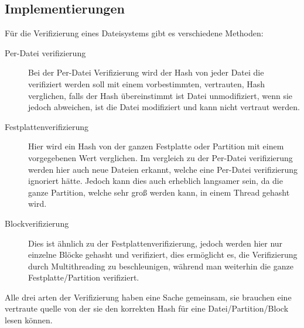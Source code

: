 \subsection{Implementierungen}
Für die Verifizierung eines Dateisystems gibt es verschiedene Methoden:
\begin{description}
\item[Per-Datei verifizierung]
  Bei der Per-Datei Verifizierung wird der Hash von jeder Datei die verifiziert werden soll mit einem vorbestimmten, vertrauten, Hash verglichen, falls der Hash übereinstimmt ist Datei unmodifiziert, wenn sie jedoch abweichen, ist die Datei modifiziert und kann nicht vertraut werden.
\item[Festplattenverifizierung]
  Hier wird ein Hash von der ganzen Festplatte oder Partition mit einem vorgegebenen Wert verglichen. Im vergleich zu der Per-Datei verifizierung werden hier auch neue Dateien erkannt, welche eine Per-Datei verifizierung ignoriert hätte. Jedoch kann dies auch erheblich langsamer sein, da die ganze Partition, welche sehr groß werden kann, in einem Thread gehasht wird.
\item[Blockverifizierung]
  Dies ist ähnlich zu der Festplattenverifizierung, jedoch werden hier nur einzelne Blöcke gehasht und verifiziert, dies ermöglicht es, die Verifizierung durch Multithreading zu beschleunigen, während man weiterhin die ganze Festplatte/Partition verifiziert.
\end{description}
Alle drei arten der Verifizierung haben eine Sache gemeinsam, sie brauchen eine vertraute quelle von der sie den korrekten Hash für eine Datei/Partition/Block lesen können.

